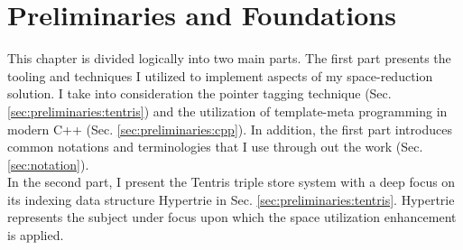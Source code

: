 \chapter{Preliminaries and Foundations}
\label{ch:preliminaries}

This chapter is divided logically into two main parts. The first part presents the tooling and techniques I utilized to implement aspects of my space-reduction solution. I take into consideration the pointer tagging technique (Sec. \ref{sec:preliminaries:tentris}) and the utilization of template-meta programming in modern C++ (Sec. \ref{sec:preliminaries:cpp}). In addition, the first part introduces common notations and terminologies that I  use through out the work (Sec. \ref{sec:notation}). \\ 

In the second part, I present the Tentris triple store system with a deep focus on its indexing data structure Hypertrie in Sec. \ref{sec:preliminaries:tentris}. 
Hypertrie represents the subject under focus upon which the space utilization enhancement is applied.





